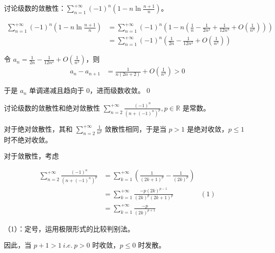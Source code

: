 \begin{ques}
	讨论级数的敛散性：$\displaystyle \sum _{n=1}^{+\infty }( -1)^{n}\left( 1-n\ln\frac{n+1}{n}\right)$。
\end{ques}


\begin{align*}
	\sum _{n=1}^{+\infty }( -1)^{n}\left( 1-n\ln\frac{n+1}{n}\right) & =\sum _{n=1}^{+\infty }( -1)^{n}\left( 1-n\left(\frac{1}{n} -\frac{1}{2n^{2}} +\frac{1}{12n^{3}} +O\left(\frac{1}{n^{4}}\right)\right)\right)\\
	& =\sum _{n=1}^{+\infty }( -1)^{n}\left(\frac{1}{2n} -\frac{1}{12n^{2}} +O\left(\frac{1}{n^{3}}\right)\right)
\end{align*}

令 $\displaystyle a_{n} =\frac{1}{2n} -\frac{1}{12n^{2}} +O\left(\frac{1}{n^{3}}\right)$，则
\begin{align*}
	a_{n} -a_{n+1} & =\frac{1}{n( 2n+2)} +O\left(\frac{1}{n^{3}}\right)  >0
\end{align*}

于是 $\displaystyle a_{n}$ 单调递减且趋向于 0，进而级数收敛。\qed 





\begin{ques}
	讨论级数的敛散性和绝对敛散性 $\displaystyle \sum _{n=2}^{+\infty }\frac{( -1)^{n}}{\left( n+( -1)^{n}\right)^{p}} ,p\in \mathbb{R}$ 是常数。
\end{ques}



对于绝对敛散性，其和 $\displaystyle \sum _{n=2}^{+\infty }\frac{1}{n^{p}}$ 敛散性相同，于是当 $\displaystyle p >1$ 是绝对收敛，$\displaystyle p\leqslant 1$ 时不绝对收敛。

对于敛散性，考虑


\begin{align*}
	\sum _{n=2}^{+\infty }\frac{( -1)^{n}}{\left( n+( -1)^{n}\right)^{p}} & =\sum _{k=1}^{+\infty }\left(\frac{1}{( 2k+1)^{p}} -\frac{1}{( 2k)^{p}}\right) & \\
	& =\sum _{k=1}^{+\infty }\frac{-p( 2k)^{p-1}}{( 2k)^{p}( 2k+1)^{p}} & ( 1)\\
	& =\sum _{k=1}^{+\infty }\frac{-p}{( 2k)^{p+1}} & 
\end{align*}

（1）：定号，运用极限形式的比较判别法。



因此，当 $\displaystyle p+1 >1\ i.e.\ p >0$ 时收敛，$\displaystyle p\leqslant 0$ 时发散。

